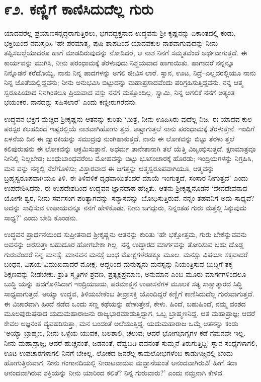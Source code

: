 
\chapter{೯೨. ಕಣ್ಣಿಗೆ ಕಾಣಿಸಿದುದೆಲ್ಲ ಗುರು}

ಯಾದವರೆಲ್ಲ ಪ್ರಯಾಣಸನ್ನದ್ಧರಾಗುತ್ತಿರಲು, ಭಗವದ್ಭಕ್ತನಾದ ಉದ್ಧವನು ಶ್ರೀ ಕೃಷ್ಣನನ್ನು ಏಕಾಂತದಲ್ಲಿ ಕಂಡು, ಭಕ್ತಿಯಿಂದ ನಮಸ್ಕರಿಸಿ ‘ಹೇ ಪರಮಾತ್ಮ, ಪುಷಿ ಶಾಪದಿಂದ ಯಾದವಕುಲ ನಾಶವಾಗುವುದನ್ನು ನೀನು ತಪ್ಪಿಸಬಲ್ಲೆಯಾದರೂ ಹಾಗೆ ಮಾಡದಿರುವುದನ್ನು ನೋಡಿದರೆ, ಆ ನಾಶ ನಿನಗೆ ಸಮ್ಮತವೆಂದೆ ಅರ್ಥವಾಗುತ್ತದೆ. ಈ ಕಾರ್ಯವನ್ನು ಮುಗಿಸಿ, ನೀನು ಪರಂಧಾಮಕ್ಕೆ ತೆರಳುವುದು ನಿಶ್ಚಯವಾದ ಹಾಗಾಯಿತು. ಹಾಗಾದರೆ ನನ್ನನ್ನೂ ನಿನ್ನೊಡನೆ ಕರೆದೊಯ್ಯಿ. ನಾನು ನಿನ್ನ ಪಾದಗಳನ್ನು ಅಗಲಿ ಜೀವಿಸ ಲಾರೆ. ಸ್ನಾನ, ಊಟ, ನಿದ್ರೆ–ಎಲ್ಲದರಲ್ಲಿಯೂ ನಾನು ನಿನ್ನ ಜೊತೆಯಲ್ಲಿದ್ದವನು; ನೀನು ಅನುಭವಿಸಿ ಬಿಟ್ಟುದನ್ನು ಮಹಾಪ್ರಸಾದವೆಂದು ಪರಿಗ್ರಹಿಸುತ್ತಿದ್ದವನು. ನನ್ನ ಆತ್ಮ ಸ್ವರೂಪಿಯಾದ ನಿನಗಿಂತಲೂ ಪ್ರಿಯವಾದ ವಸ್ತು ನನಗೆ ಮತ್ತೊಂದಿಲ್ಲ. ಸ್ವಾಮಿ, ನಿನ್ನ ಅಗಲಿಕೆ ನನಗೆ ಅತ್ಯಂತ ಭಯಂಕರ. ನಾನದನ್ನು ಸಹಿಸಲಾರೆ’ ಎಂದು ಕಣ್ಣೀರುಗರೆದನು.

ಉದ್ಧವನ ಭಕ್ತಿಗೆ ಮೆಚ್ಚಿದ ಶ್ರೀಕೃಷ್ಣನು ಆತನನ್ನು ಕುರಿತು ‘ಮಿತ್ರ, ನೀನು ಊಹಿಸಿರು ವುದೆಲ್ಲ ನಿಜ. ಈ ಯಾದವ ಕುಲ ಪರಸ್ಪರ ಕಲಹದಿಂದ ಇಷ್ಟರಲ್ಲಿಯೆ ನಾಶವಾಗಿಹೋಗು ತ್ತದೆ. ಅಷ್ಟಾಗುತ್ತಲೆ ನಾನು ಪರಂಧಾಮಕ್ಕೆ ತೆರಳುತ್ತೇನೆ. ಇಂದಿಗೆ ಏಳನೆಯ ದಿನ ಈ ದ್ವಾರಕಿಯನ್ನು ಸಮುದ್ರವು ನುಂಗಿಹಾಕುತ್ತದೆ. ನಾನು ಈ ಲೋಕವನ್ನು ಬಿಟ್ಟು ತೆರಳು ತ್ತಲೆ ಕಲಿಪುರುಷನು ಈ ಲೋಕವನ್ನು ಆಕ್ರಮಿಸುತ್ತಾನೆ. ಅಧರ್ಮ ತಾನೇತಾನಾಗಿ ತಲೆ ಯೆತ್ತಿ ವಿಜೃಂಭಿಸುತ್ತದೆ. ಕ್ಷಣಮಾತ್ರವೂ ನೀನಿಲ್ಲಿ ನಿಲ್ಲಬೇಡ; ಬಂಧುಬಾಂಧವರೆಂಬ ಮೋಹವನ್ನು ಬಿಟ್ಟು ಭೂಸಂಚಾರಕ್ಕೆ ಹೊರಡು; ಇಂದ್ರಿಯಗಳನ್ನು ನಿಗ್ರಹಿಸಿ, ಮನ ವನ್ನು ನನ್ನಲ್ಲಿ ನೆಲೆಗೊಳಿಸು; ವಿಸ್ತಾರವಾದ ಈ ಜಗತ್ತನ್ನು ಆತ್ಮಸ್ವರೂಪವಾಗಿಯೂ, ಆತ್ಮವನ್ನು ಬ್ರಹ್ಮಸ್ವರೂಪವಾಗಿಯೂ ತಿಳಿ. ಈ ತಿಳಿವಳಿಕೆ ದೃಢವಾಯಿತೆಂದರೆ ಮಾಯೆ ಇಂಗುತ್ತದೆ, ಸಂಸಾರ ನೀಗುತ್ತದೆ’ ಎಂದು ಉಪದೇಶಿಸಿದನು. ಈ ಉಪದೇಶದಿಂದ ಉದ್ಧವನ ಜ್ಞಾನದಾಹ ಹೆಚ್ಚಿತು. ಆತನು ಶ್ರೀಕೃಷ್ಣನೊಡನೆ ‘ದೇವದೇವನಾದ ಯೋಗೇ ಶ್ವರ, ನೀನು ಸರ್ವಸಂಗ ಪರಿತ್ಯಾಗವನ್ನು–ಸನ್ಯಾಸವನ್ನು–ಬೋಧಿಸುತ್ತಿರುವೆ. ನನ್ನಂ ತಹವನಿಗೆ ಅದು ಸಾಧ್ಯವೆ? ಅದನ್ನು ಸಾಧಿಸುವ ಉಪಾಯವನ್ನೂ ನನಗೆ ಹೇಳಿಕೊಡು. ನೀನು ಜಗದ್ಗುರು, ನಿನ್ನಂತಹ ಗುರು ಮತ್ತೆಲ್ಲಿ ಸಿಕ್ಕುವುದು ಸಾಧ್ಯ?’ ಎಂದು ಬೇಡಿ ಕೊಂಡನು. 

ಉದ್ಧವನ ಪ್ರಾರ್ಥನೆಯಿಂದ ಸುಪ್ರೀತನಾದ ಶ್ರೀಕೃಷ್ಣನು ಆತನನ್ನು ಕುರಿತು ‘ಹೇ ಭಕ್ತೋತ್ತಮ, ಗುರು ಬೇಕೆನ್ನುವವನು ಅವನನ್ನು ಅರಸುತ್ತಾ ಬಹುದೂರ ಹೋಗಬೇಕಾ ಗಿಲ್ಲ. ನನ್ನ ಉದ್ಧಾರದ ಮಾರ್ಗವನ್ನು ತೋರಿಸುವ ಬಹು ದೊಡ್ಡ ಗುರುವೆಂದರೆ ನಿನ್ನ ಮನಸ್ಸೆ. ಮಾನವನ ಮನಸ್ಸೆ ಬಂಧ ಮೋಕ್ಷಗಳೆರಡಕ್ಕೂ ಮೂಲ. ಮನಸ್ಸು ವಿಷಯಾ ಸಕ್ತವಾದರೆ ಬಂಧನ, ವಿಷಯ ವಿಮುಖವಾದರೆ ಮೋಕ್ಷ. ಆದ್ದರಿಂದ ಮನುಷ್ಯನು ಮನಸ್ಸನ್ನು ನಿಯಂತ್ರಿಸುವ ಬುದ್ಧಿಗೆ ತಕ್ಕ ಶಿಕ್ಷಣವನ್ನು ನೀಡಬೇಕು. ಶ್ರುತಿ ಸ್ಮೃತಿಗಳ ಶ್ರವಣ, ಪ್ರತ್ಯಕ್ಷಪ್ರಮಾಣ, ಅನುಮಾನ ಎಂಬ ಮೂರು ಮಾರ್ಗಗಳಿಂದಲೂ ಬುದ್ಧಿ ಯನ್ನು ಹದಗೊಳಿಸಿದಾಗ ಇಂದ್ರಿಯಜಯ, ಪರಮಾತ್ಮನ ಉಪಾಸನೆಗಳ ಮೂಲಕ ಸತ್ಯ ಸಾಕ್ಷಾತ್ಕಾರದ ಸಿದ್ಧಿ ಸಾಧ್ಯವಾಗುತ್ತದೆ. ಅಯ್ಯಾ ಉದ್ಧವ, ತಿಳಿಯಬೇಕೆಂಬ ತೀವ್ರಾಸಕ್ತಿ ಯೊಂದಿದ್ದರೆ ಕಣ್ಣಿಗೆ ಕಾಣಿಸಿದುದೆಲ್ಲ ಗುರುವಾಗುತ್ತದೆ. ಈ ವಿಚಾರವಾಗಿ ಹಿಂದೆ ನಡೆದ ಒಂದು ಸಣ್ಣ ಕಥೆಯನ್ನು ಹೇಳುತ್ತೇನೆ, ಕೇಳು. ಹಿಂದೆ, ಬಹುಹಿಂದೆ, ನಮ್ಮ ವಂಶದ ಮೂಲಪುರುಷನಾದ ಯದುಮಹಾರಾಜನು ರಾಜ್ಯಭಾರಮಾಡುತ್ತಿದ್ದಾಗ, ಒಬ್ಬ ಬ್ರಾಹ್ಮಣನಿದ್ದ. ಆತ ಮಹಾಪ್ರಾಜ್ಞ; ಆದರೆ ಕೇವಲ ಅಜ್ಞನಂತೆ ವ್ಯವಹರಿಸುತ್ತಾ, ಮನ ಬಂದಂತೆ ಅಲೆಯುತ್ತಿದ್ದ. ಯದುಮಹಾರಾಜ ಒಮ್ಮೆ ಆತನನ್ನು ಕಂಡು ‘ಅಯ್ಯಾ ಬ್ರಾಹ್ಮಣ, ನೀನು ಒಳ್ಳೆಯ ಯುವಕ, ಬಲಶಾಲಿ, ಚೆಲುವ; ಆದರೆ ಭೋಗಭಾಗ್ಯಗಳ ಕಡೆ ಗಮನವೇ ಇಲ್ಲ. ನೀನು ಮಹಾಪ್ರಾಜ್ಞ; ಆದರೆ ಹುಚ್ಚನಂತೆ, ಜಡನಂತೆ, ದೆವ್ವಬಡಿ ದವನಂತೆ ಸುಮ್ಮನೆ ತಿರುಗುತ್ತಿದ್ದಿ! ಸ್ನಾನ ಸಂಧ್ಯೆಗಳಾಗಲಿ, ಊಟ ಉಪಚಾರಗಳಾಗಲಿ ನಿನಗೆ ಬೇಕಿಲ್ಲ. ಲೋಕದ ಜನರೆಲ್ಲ ಕಾಮಲೋಭಗಳೆಂಬ ಕಾಡುಗಿಚ್ಚಿನಲ್ಲಿ ಬೆಂದು ಹೋಗುತ್ತಿರುವಾಗ, ನೀನು ಗಂಗಾನದಿಯಲ್ಲಿ ನೀರಾಟವಾಡುವ ಮದ್ದಾನೆಯಂತೆ ಆನಂದವಾಗಿರುವಿ! ಹೀಗೆ ಸದಾ ಆನಂದವಾಗಿರುವ ಶಕ್ತಿಯನ್ನು ನೀನು ಯಾರಿಂದ ಕಲಿತೆ? ನಿನ್ನ ಗುರುವಾರು?’ ಎಂದು ನಮ್ರನಾಗಿ ಕೇಳಿದ.


